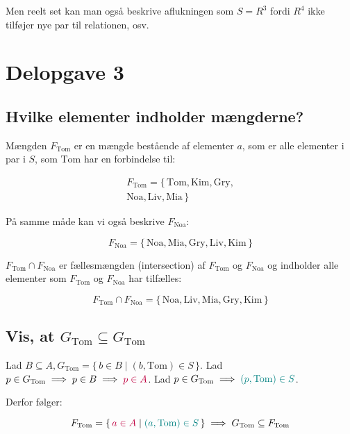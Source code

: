 Men reelt set kan man også beskrive aflukningen som \(S = R^{3}\) fordi \(R^4\) ikke tilføjer nye par til
relationen, osv.


\section{Delopgave 3}\label{sec:delopgave-3}

\subsection{Hvilke elementer indholder mængderne?}\label{subsec:hvilke-elementer-indholder-mngderne?}

Mængden \(F_{\text{Tom}}\) er en mængde bestående af elementer \(a\), som er alle elementer i par i \(S\), som
\(\text{Tom}\) har en forbindelse til:

\begin{equation}
    \begin{split}
        F_{\text{Tom}} = \{\,\text{Tom}, \text{Kim}, \text{Gry}, \\
        \text{Noa}, \text{Liv}, \text{Mia}\,\}
    \end{split}\label{eq:equation9}
\end{equation}

På samme måde kan vi også beskrive \(F_{\text{Noa}}\):

\begin{equation}
    F_{\text{Noa}} = \{\,\text{Noa}, \text{Mia}, \text{Gry}, \text{Liv}, \text{Kim}\,\}\label{eq:equation8}
\end{equation}

\(F_{\text{Tom}} \cap F_{\text{Noa}}\) er fællesmængden (intersection) af \(F_{\text{Tom}}\) og \(F_{\text{Noa}}\)
og indholder alle elementer som \(F_{\text{Tom}}\) og \(F_{\text{Noa}}\) har tilfælles:

\begin{equation}
    F_{\text{Tom}} \cap F_{\text{Noa}} = \{\,\text{Noa}, \text{Liv}, \text{Mia}, \text{Gry}, \text{Kim}\,\}
    \label{eq:equation10}
\end{equation}

\subsection{Vis, at \(G_{\text{Tom}} \subseteq G_{\text{Tom}}\)}
\label{subsec:vis-at-(g_{text{tom}}-subseteq-g_{text{tom}})}

Lad \(B \subseteq A, G_{\text{Tom}} = \{\,b \in B \mid (b, \text{Tom}) \in S\,\}\label{eq:equation11}\).
Lad \(p \in G_{\text{Tom}} \implies p \in B \implies \textcolor{purple}{p \in A}\).
Lad \(p \in G_{\text{Tom}} \implies \textcolor{teal}{(p, \text{Tom}) \in S}\).

Derfor følger:

\begin{equation}
    F_{\text{Tom}} = \{\,\textcolor{purple}{a \in A} \mid \textcolor{teal}{(a, \text{Tom}) \in S}\,\} \implies
    G_{\text{Tom}} \subseteq F_{\text{Tom}}\label{eq:equation2}
\end{equation}
